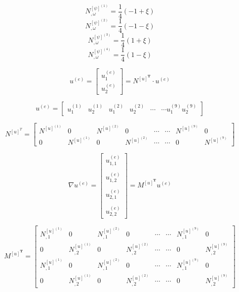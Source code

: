 \documentclass{article}
\begin{document}
\begin{equation}
N_{,\omega}^{[\psi]^{(1)}} = \dfrac{1}{4}(-1+\xi)
\end{equation}
\begin{equation}
N_{,\omega}^{[\psi]^{(2)}} = \dfrac{1}{4}(-1-\xi)
\end{equation}
\begin{equation}
N_{,\omega}^{[\psi]^{(3)}} = \dfrac{1}{4}(1+\xi)
\end{equation}
\begin{equation}
N_{,\omega}^{[\psi]^{(4)}} = \dfrac{1}{4}(1-\xi)
\end{equation}


\[
u^{(e)}=
\begin{bmatrix}
u_1^{(e)}\\
u_2^{(e)}
\end{bmatrix}
=N^{[u]^{\textbf{T}}}\cdot {u}^{(e)}
\]

\[
u^{(e)}=
\begin{bmatrix}
u_1^{(1)}&u_2^{(1)}&u_1^{(2)}&u_2^{(2)}&\cdots &\cdots u_1^{(9)} u_2^{(9)}
\end{bmatrix}
\]

\[
N^{[u]^{T}}=
\begin{bmatrix}
N^{[u]^{(1)}}&0&N^{[u]^{(2)}}&0&\cdots &\cdots& N^{[u]^{(9)}}&0 \\
0&N^{[u]^{(1)}}&0&N^{[u]^{(2)}}&\cdots &\cdots& 0&N^{[u]^{(9)}}
\end{bmatrix}
\]

\[
\nabla u^{(e)}=
\begin{bmatrix}
u_{1,1}^{(e)} \\
\\
u_{1,2}^{(e)} \\
\\
u_{2,1}^{(e)} \\
\\
u_{2,2}^{(e)} 
\end{bmatrix}
=M^{[u]^{\textbf{T}}}u^{(e)}
\]

\[
M^{[u]^\textbf{T}}=
\begin{bmatrix}
N_{,1}^{[u]^{(1)}}&0&N_{,1}^{[u]^{(2)}}&0&\cdots &\cdots& N_{,1}^{[u]^{(9)}}&0 \\
0&N_{,2}^{[u]^{(1)}}&0&N_{,2}^{[u]^{(2)}}&\cdots &\cdots& 0&N_{,2}^{[u]^{(9)}} \\
N_{,1}^{[u]^{(1)}}&0&N_{,1}^{[u]^{(2)}}&0&\cdots &\cdots& N_{,1}^{[u]^{(9)}}&0 \\
0&N_{,2}^{[u]^{(1)}}&0&N_{,2}^{[u]^{(2)}}&\cdots &\cdots& 0&N_{,2}^{[u]^{(9)}}
\end{bmatrix}
\]
\end{document}
